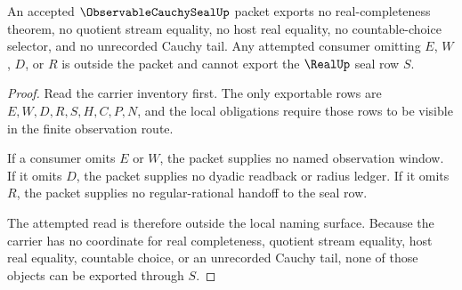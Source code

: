 \begin{theorem}
\label{thm:observable-cauchy-seal-nonescape}
An accepted $\ObservableCauchySealUp$ packet exports no real-completeness theorem, no quotient stream equality, no host real equality, no countable-choice selector, and no unrecorded Cauchy tail. Any attempted consumer omitting $E$, $W$, $D$, or $R$ is outside the packet and cannot export the $\RealUp$ seal row $S$.
\end{theorem}
\begin{proof}
Read the carrier inventory first. The only exportable rows are $E,W,D,R,S,H,C,P,N$, and the local obligations require those rows to be visible in the finite observation route.

If a consumer omits $E$ or $W$, the packet supplies no named observation window. If it omits $D$, the packet supplies no dyadic readback or radius ledger. If it omits $R$, the packet supplies no regular-rational handoff to the seal row.

The attempted read is therefore outside the local naming surface. Because the carrier has no coordinate for real completeness, quotient stream equality, host real equality, countable choice, or an unrecorded Cauchy tail, none of those objects can be exported through $S$.
\end{proof}

\begin{closurestatus}{\ObservableCauchySealUp}
  \theoryclosure{\seedClosure}
  \formalstatus{\unformalizedV}
\end{closurestatus}
